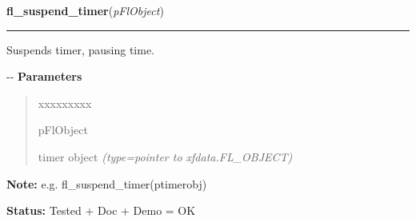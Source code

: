     \label{xformslib:fltimer:fl_suspend_timer}

    \vspace{0.5ex}

\hspace{.8\funcindent}\begin{boxedminipage}{\funcwidth}

    \raggedright \textbf{fl\_suspend\_timer}(\textit{pFlObject})

    \vspace{-1.5ex}

    \rule{\textwidth}{0.5\fboxrule}
\setlength{\parskip}{2ex}

Suspends timer, pausing time.

-{}-
\setlength{\parskip}{1ex}
      \textbf{Parameters}
      \vspace{-1ex}

      \begin{quote}
        \begin{Ventry}{xxxxxxxxx}

          \item[pFlObject]


timer object
            {\it (type=pointer to xfdata.FL\_OBJECT)}

        \end{Ventry}

      \end{quote}

\textbf{Note:} 
e.g. fl\_suspend\_timer(ptimerobj)


\textbf{Status:} 
Tested + Doc + Demo = OK


    \end{boxedminipage}

    \label{xformslib:fltimer:fl_resume_timer}

    \vspace{0.5ex}

